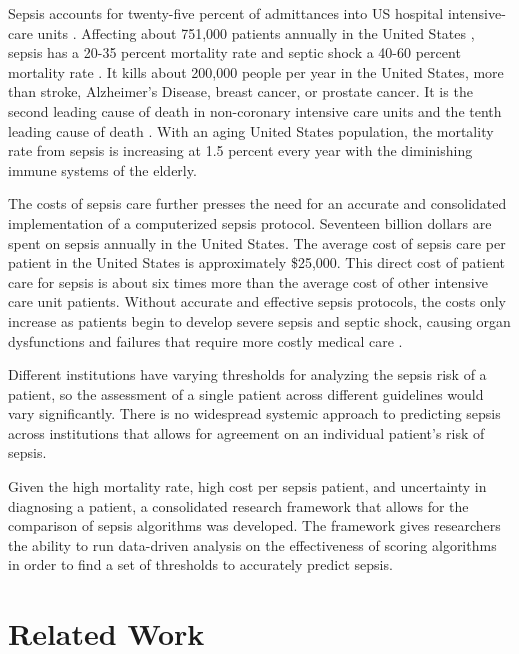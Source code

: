 \documentclass{sig-alternate}
\begin{document}
Sepsis accounts for twenty-five percent of admittances into US hospital intensive-care units \cite{epi}. Affecting about 751,000 patients annually in the United States \cite{sepsis_def}, sepsis has a 20-35 percent mortality rate and septic shock a 40-60 percent mortality rate \cite{meds}. It kills about 200,000 people per year in the United States, more than stroke, Alzheimer's Disease, breast cancer, or prostate cancer. It is the second leading cause of death in non-coronary intensive care units and the tenth leading cause of death \cite{epi}. With an aging United States population, the mortality rate from sepsis is increasing at 1.5 percent every year with the diminishing immune systems of the elderly.

The costs of sepsis care further presses the need for an accurate and consolidated implementation of a computerized sepsis protocol. Seventeen billion dollars are spent on sepsis annually in the United States. The average cost of sepsis care per patient in the United States is approximately \$25,000. This direct cost of patient care for sepsis is about six times more than the average cost of other intensive care unit patients. Without accurate and effective sepsis protocols, the costs only increase as patients begin to develop severe sepsis and septic shock, causing organ dysfunctions and failures that require more costly medical care \cite{yearbook}.

Different institutions have varying thresholds for analyzing the sepsis risk of a patient, so the assessment of a single patient across different guidelines would vary significantly. There is no widespread systemic approach to predicting sepsis across institutions that allows for agreement on an individual patient's risk of sepsis. 

Given the high mortality rate, high cost per sepsis patient, and uncertainty in diagnosing a patient, a consolidated research framework that allows for the comparison of sepsis algorithms was developed.  The framework gives researchers the ability to run data-driven analysis on the effectiveness of scoring algorithms in order to find a set of thresholds to accurately predict sepsis.

\vspace{10pt}
\section{Related Work}
\vspace{10pt}
\label{sec:related_work}
\end{document}
